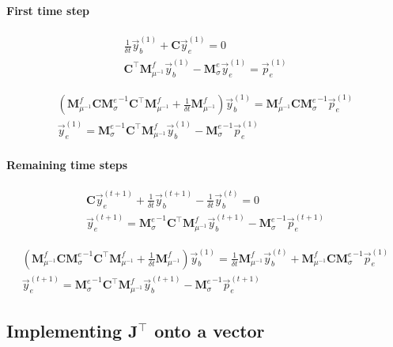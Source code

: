 \documentclass[]{article}
\newcommand{\dcurl}{\ensuremath{{\mathbf C}}}
\newcommand{\M}{\ensuremath{{\mathbf M}}}
\newcommand{\MfMui}{\ensuremath{{\M^f_{\mu^{-1}}}}}
\newcommand{\MeSig}{\ensuremath{{\M^e_\sigma}}}
\begin{document}
\paragraph{First time step}

\begin{subequations}
    \begin{align}
        \frac{1}{\delta t} \vec{y}_{b}^{(1)} + \dcurl \vec{y}_{e}^{(1)} = 0 \\
        \dcurl^\top \MfMui \vec{y}_b^{(1)} - \MeSig \vec{y}_e^{(1)} = \vec{p}_e^{(1)}
    \end{align}
\end{subequations}

\begin{subequations}
    \begin{align}
        \left( \MfMui \dcurl \MeSig^{-1} \dcurl^\top \MfMui + \frac{1}{\delta t} \MfMui \right) \vec{y}_{b}^{(1)} = \MfMui \dcurl \MeSig^{-1} \vec{p}_e^{(1)} \\
        \vec{y}_e^{(1)} = \MeSig^{-1} \dcurl^\top \MfMui \vec{y}_b^{(1)} - \MeSig^{-1} \vec{p}_e^{(1)}
    \end{align}
\end{subequations}

\paragraph{Remaining time steps}

\begin{subequations}
    \begin{align}
        \dcurl \vec{y}_{e}^{(t+1)} + \frac{1}{\delta t} \vec{y}_{b}^{(t+1)} - \frac{1}{\delta t} \vec{y}_{b}^{(t)} = 0 \\
        \vec{y}_e^{(t+1)} = \MeSig^{-1} \dcurl^\top \MfMui \vec{y}_b^{(t+1)} - \MeSig^{-1} \vec{p}_e^{(t+1)}
    \end{align}
\end{subequations}
    
\begin{subequations}
        \begin{align}
            \left( \MfMui \dcurl \MeSig^{-1} \dcurl^\top \MfMui + \frac{1}{\delta t} \MfMui \right) \vec{y}_{b}^{(1)} = \frac{1}{\delta t} \MfMui \vec{y}_b^{(t)} + \MfMui \dcurl \MeSig^{-1} \vec{p}_e^{(1)} \\
            \vec{y}_e^{(t+1)} = \MeSig^{-1} \dcurl^\top \MfMui \vec{y}_b^{(t+1)} - \MeSig^{-1} \vec{p}_e^{(t+1)}
        \end{align}
    \end{subequations}

\subsection{Implementing $\mathbf{J}^\top$ onto a vector}
\end{document}
